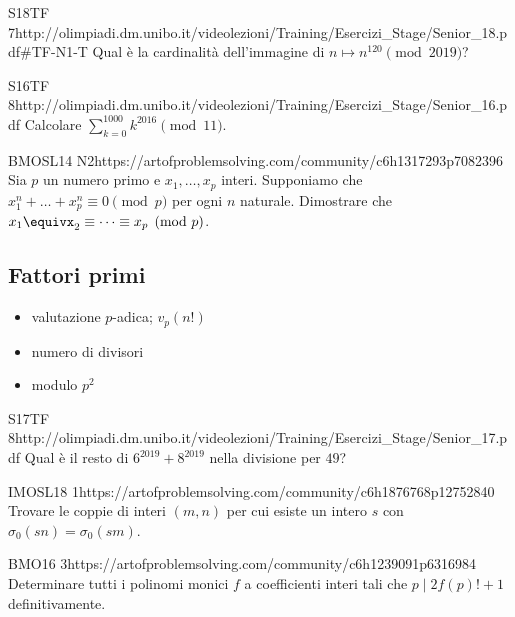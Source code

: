 \documentclass[12pt]{article}
\begin{document}
\begin{esercizio}{S18TF 7}{http://olimpiadi.dm.unibo.it/videolezioni/Training/Esercizi_Stage/Senior_18.pdf\#TF-N1-T}
    Qual è la cardinalità dell'immagine di $n\mapsto n^{120}\pmod{2019}$?
\end{esercizio}

\begin{esercizio}{S16TF 8}{http://olimpiadi.dm.unibo.it/videolezioni/Training/Esercizi_Stage/Senior_16.pdf}
    Calcolare $\sum_{k=0}^{1000} k^{2016}\pmod{11}$.
\end{esercizio}

\begin{esercizio}{BMOSL14 N2}{https://artofproblemsolving.com/community/c6h1317293p7082396}
    Sia $p$ un numero primo e $x_1,\dots,x_p$ interi. Supponiamo che $x_1^n+\dots+x_p^n\equiv0\pmod p$ per ogni $n$ naturale. Dimostrare che $x_1\equivx_2\equiv\dots\equiv x_p\pmod p$.
\end{esercizio}


\subsection{Fattori primi}

\begin{itemize}
    \item valutazione $p$-adica; $v_p(n!)$
    \item numero di divisori
    \item modulo $p^2$
\end{itemize}

\begin{esercizio}{S17TF 8}{http://olimpiadi.dm.unibo.it/videolezioni/Training/Esercizi_Stage/Senior_17.pdf}
    Qual è il resto di $6^{2019}+8^{2019}$ nella divisione per $49$?
\end{esercizio}

\begin{esercizio}{IMOSL18 1}{https://artofproblemsolving.com/community/c6h1876768p12752840}
    Trovare le coppie di interi $(m,n)$ per cui esiste un intero $s$ con $\sigma_0(sn)=\sigma_0(sm)$.
\end{esercizio}

\begin{esercizio}{BMO16 3}{https://artofproblemsolving.com/community/c6h1239091p6316984}
    Determinare tutti i polinomi monici $f$ a coefficienti interi tali che $p\mid 2f(p)!+1$ definitivamente.
\end{esercizio}
\end{document}
